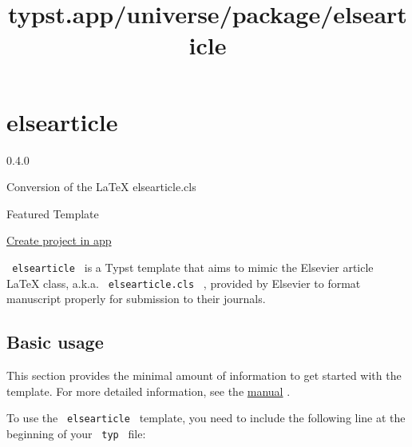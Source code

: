 \title{typst.app/universe/package/elsearticle}

\label{banner}
\label{template-thumbnail}

\section{elsearticle}\label{elsearticle}

{ 0.4.0 }

Conversion of the LaTeX elsearticle.cls

{ } Featured Template

\href{/app?template=elsearticle&version=0.4.0}{Create project in app}

\label{readme}
\href{https://github.com/typst/packages/raw/main/packages/preview/elsearticle/0.4.0/}{\pandocbounded{}}
\href{https://github.com/maucejo/elsearticle/blob/main/LICENSE}{}
\href{https://github.com/maucejo/elsearticle/blob/main/docs/manual.pdf}{}

\texttt{\ elsearticle\ } is a Typst template that aims to mimic the
Elsevier article LaTeX class, a.k.a. \texttt{\ elsearticle.cls\ } ,
provided by Elsevier to format manuscript properly for submission to
their journals.

\subsection{Basic usage}\label{basic-usage}

This section provides the minimal amount of information to get started
with the template. For more detailed information, see the
\href{https://github.com/maucejo/elsearticle/blob/main/docs/manual.pdf}{manual}
.

To use the \texttt{\ elsearticle\ } template, you need to include the
following line at the beginning of your \texttt{\ typ\ } file:

\begin{Shaded}
\begin{Highlighting}[]
\end{Highlighting}
\end{Shaded}

